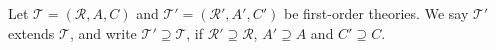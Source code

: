 Let $\mathcal{T} = (\mathcal{R}, A, C)$ and $\mathcal{T}' = (\mathcal{R}', A', C')$ be first-order theories. We say $\mathcal{T}'$ extends $\mathcal{T}$, and write $\mathcal{T}' \supseteq \mathcal{T}$, if $\mathcal{R}' \supseteq \mathcal{R}$, $A' \supseteq A$ and $C' \supseteq C$.
